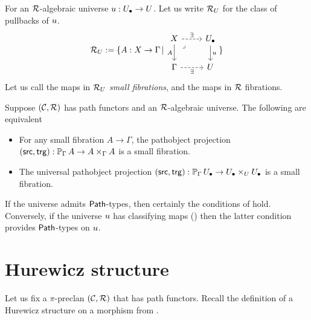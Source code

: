 For an $\RR$-algebraic universe $\uu : \Ulow \to \U$.
Let us write $\RR_\U$ for the class of pullbacks of $\uu$.
\[
  \RR_\U := \{ A : X \to \Gamma \st \begin{tikzcd}
  X & \Ulow \\
  \Gamma & \U
  \arrow["\exists", dashed, from=1-1, to=1-2]
  \arrow["A"', from=1-1, to=2-1]
  \arrow["\lrcorner"{anchor=center, pos=0.125}, draw=none, from=1-1, to=2-2]
  \arrow["\uu", from=1-2, to=2-2]
  \arrow["\exists"', dashed, from=2-1, to=2-2]
\end{tikzcd}\}
\]
Let us call the maps in $\RR_\U$ \emph{small fibrations},
and the maps in $\RR$ fibrations.

\begin{proposition}\label{prop:universal-pathobject}
  Suppose $(\CC,\RR)$ has path functors
  and an $\RR$-algebraic universe.
  The following are equivalent
  \begin{itemize}
    \item For any small fibration $A \to \Gamma$,
      the pathobject projection
      $(\src,\trg) : \arr[\Gamma] A \to A \times_\Gamma A$
      is a small fibration.
    \item The universal pathobject projection
      $(\src,\trg) : \arr[\Gamma] \Ulow \to \Ulow \times_\U \Ulow$
      is a small fibration.
  \end{itemize}
\end{proposition}
If the universe admits $\Path$-types,
then certainly the conditions of  hold.
Conversely, if the universe $\uu$ has classifying maps
()
then the latter condition provides $\Path$-types on $\uu$.


\section{Hurewicz structure}

Let us fix a $\pi$-preclan $(\CC,\RR)$ that has path functors.
Recall the definition of a Hurewicz structure on a morphism
from .

